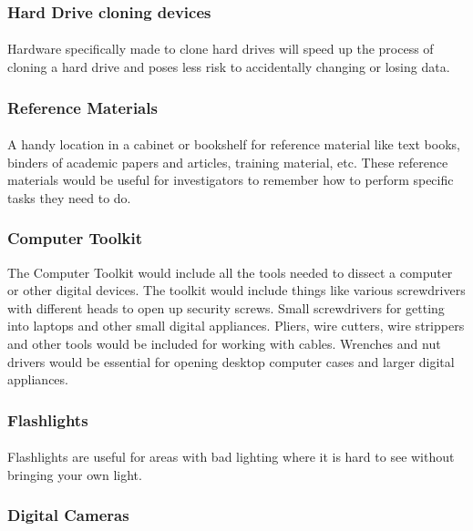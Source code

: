 \documentclass{article}
\begin{document}
\subsubsection{Hard Drive cloning devices}
\paragraph{}
Hardware specifically made to clone hard drives will speed up the process of cloning a hard drive and poses less risk to accidentally changing or losing data.
\subsubsection{Reference Materials}
\paragraph{}
A handy location in a cabinet or bookshelf for reference material like text books, binders of academic papers and articles, training material, etc.
These reference materials would be useful for investigators to remember how to perform specific tasks they need to do.
\subsubsection{Computer Toolkit}
The Computer Toolkit would include all the tools needed to dissect a computer or other digital devices.
The toolkit would include things like various screwdrivers with different heads to open up security screws. 
Small screwdrivers for getting into laptops and other small digital appliances. 
Pliers, wire cutters, wire strippers and other tools would be included for working with cables. 
Wrenches and nut drivers would be essential for opening desktop computer cases and larger digital appliances. 
\subsubsection{Flashlights}
\paragraph{}
Flashlights are useful for areas with bad lighting where it is hard to see without bringing your own light. 
\subsubsection{Digital Cameras}
\end{document}
